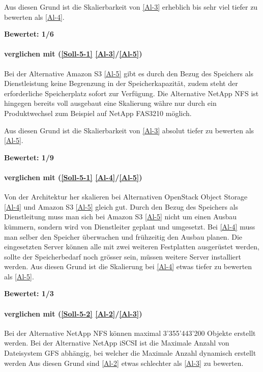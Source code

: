 Aus diesen Grund ist die Skalierbarkeit von  \ref{Al-3} erheblich bis sehr viel tiefer zu bewerten als  \ref{Al-4}.

\textbf{Bewertet: 1/6}

\paragraph*{  verglichen mit  (\ref{Soll-5-1} \ref{Al-3}/\ref{Al-5})}
Bei der Alternative Amazon S3 \ref{Al-5} gibt es durch den Bezug des Speichers als Dienstleistung keine Begrenzung in der Speicherkapazität, zudem steht der erforderliche Speicherplatz sofort zur Verfügung. Die Alternative NetApp NFS ist hingegen bereits voll ausgebaut eine Skalierung währe nur durch ein Produktwechsel zum Beispiel auf NetApp FAS3210 möglich.

Aus diesen Grund ist die Skalierbarkeit von  \ref{Al-3} absolut tiefer zu bewerten als  \ref{Al-5}.

\textbf{Bewertet: 1/9}

\paragraph*{  verglichen mit  (\ref{Soll-5-1} \ref{Al-4}/\ref{Al-5})}
Von der Architektur her skalieren bei Alternativen OpenStack Object Storage \ref{Al-4} und Amazon S3 \ref{Al-5} gleich gut. Durch den Bezug des Speichers als Dienstleitung muss man sich bei Amazon S3 \ref{Al-5} nicht um einen Ausbau kümmern, sondern wird von Dienstleiter geplant und umgesetzt. Bei \ref{Al-4} muss man selber den Speicher überwachen und frühzeitig den Ausbau planen. Die eingesetzten Server können alle mit zwei weiteren Festplatten ausgerüstet werden, sollte der Speicherbedarf noch grösser sein, müssen weitere Server installiert werden. Aus diesen Grund ist die Skalierung bei \ref{Al-4} etwas tiefer zu bewerten als \ref{Al-5}.

\textbf{Bewertet: 1/3}


\paragraph*{  verglichen mit  (\ref{Soll-5-2} \ref{Al-2}/\ref{Al-3})}
Bei der Alternative NetApp NFS können maximal 3'355'443'200 Objekte erstellt werden. Bei der Alternative NetApp iSCSI ist die Maximale Anzahl von Dateisystem GFS abhängig, bei welcher die Maximale Anzahl dynamisch erstellt werden Aus diesen Grund sind  \ref{Al-2} etwas schlechter als  \ref{Al-3} zu bewerten.

